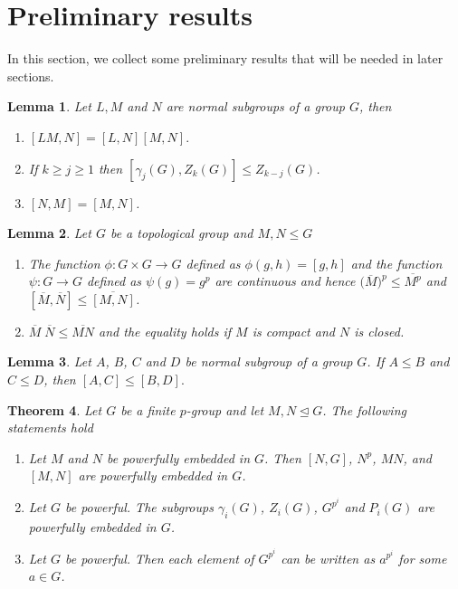 \documentclass[12pt]{elsarticle}
\newtheorem{theorem}{Theorem}[section]
\newtheorem{lemma}[theorem]{Lemma}
\newtheorem*{main corollary*}{Main Corollary}
\theoremstyle{definition}
\begin{document}
\section{Preliminary results} \label{section: preliminary results}

In this section, we collect some preliminary results that will be needed in later sections.
\begin{lemma}\cite[Exercise 1.3, Corollary 1.3.12]{McK2000}\label{PR:R:1}
     Let $L, M$ and $N$ are normal subgroups of a group $G$, then 
     \begin{enumerate}
         \item[(i)] $[LM,N]=[L,N][M,N].$ 
         \item[(ii)]If $k\geq j\geq 1$ then $[\gamma_j(G),Z_k(G)]\leq Z_{k-j}(G)$. 
         \item[(iii)] $[N,M]=[M,N]$.
     \end{enumerate}
 \end{lemma}

\begin{lemma}\label{PR:R:2}
Let $G$ be a topological group and $M,N \leqslant G$ \begin{enumerate}
    \item[(i)] The function $\phi:G\times G\to G$ defined as $\phi(g,h)= [g,h]$ and the function $\psi:G\to G$ defined as $\psi(g)= g^p$ are continuous and hence $\big({\overline{M}}\big)^p \leqslant \overline{M^p}$ and $[\overline{M},\overline{N}] \leqslant \overline{[M,N]}$.
    \item[(ii)]  $\overline{M}\;\overline{N} \leqslant \overline{MN}$ and the equality holds if $M$ is compact and $N$ is closed. 
\end{enumerate} 
 \end{lemma}

 \begin{lemma}\label{Commutator comparision}
Let $A$, $B$, $C$ and $D$ be normal subgroup of a group $G$. If $A\leqslant B$ and $C\leqslant D$, then $[A,C]\leqslant [B,D].$ 
\end{lemma}
\begin{theorem} \cite[Theorems 1.1, 1.3, Corollary 1.2, Proposition 1.7]{LM87} \label{MannLubotzky_powerfully_embedded}
    Let $G$ be a finite $p$-group and let $M,N \unlhd G$. The following statements hold
    \begin{enumerate}
        \item[(i)] Let $M$ and $N$ be powerfully embedded in $G$. Then $[N,G]$, $N^p$, $MN$, and $[M,N]$ are powerfully embedded in $G$.
        \item[(ii)] Let $G$ be powerful. The subgroups $\gamma_i(G)$, $Z_i(G)$, $G^{p^i}$ and $P_i(G)$ are powerfully embedded in $G$.
        \item[(iii)] Let $G$ be powerful. Then each element of $G^{p^i}$ can be written as $a^{p^i}$ for some $a \in G$.
    \end{enumerate} 
\end{theorem}
\end{document}
